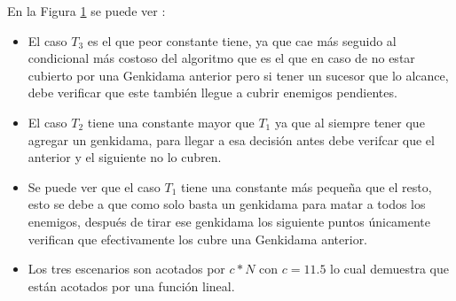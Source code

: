 	\begin{figure}[H]
		\centering
		\caption{}
		\label{fig:exp2:part_tiempo_base}
	\end{figure}
	En la Figura \ref{fig:exp2:part_tiempo_base} se puede ver :

	     \begin{itemize} 
            \item El caso $T_3$ es el que peor constante tiene, ya que cae más
				seguido al condicional más costoso del algoritmo que es el que
				en caso de no estar cubierto por una Genkidama anterior pero si
				tener un sucesor que lo alcance, debe verificar que este también
				llegue a cubrir enemigos pendientes.
            \item El caso $T_2$ tiene una constante mayor que $T_1$ ya que al
				siempre tener que agregar un genkidama, para llegar a esa
				decisión antes debe verifcar que el anterior y el siguiente no lo cubren.
             \item Se puede ver que el caso $T_1$ tiene una constante más
				 pequeña que el resto, esto se debe a que como solo basta un
				 genkidama para matar a todos los enemigos, después de tirar ese
				 genkidama los siguiente puntos únicamente verifican que
				 efectivamente los cubre una Genkidama anterior.
            \item Los tres escenarios son acotados por $c*N$ con $c = 11.5$ lo
				cual demuestra que están acotados por una función lineal.
        \end{itemize}

